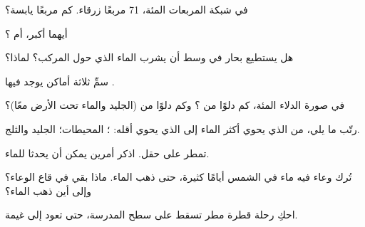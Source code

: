 \begin{exercise}[$\star$]\label{exo:g2:water-on-earth:3}
في شبكة المربعات المئة، 71 مربعًا زرقاء. كم مربعًا
يابسة؟
\end{exercise}

\begin{exercise}[$\star$]\label{exo:g2:water-on-earth:4}
أيهما أكبر،  أم ؟
\end{exercise}

\begin{exercise}[$\star$]\label{exo:g2:water-on-earth:5}
هل يستطيع بحار في وسط  أن يشرب الماء الذي حول المركب؟
لماذا؟
\end{exercise}

\begin{exercise}[$\star$]\label{exo:g2:water-on-earth:6}
سمِّ ثلاثة أماكن يوجد فيها .
\end{exercise}

\begin{exercise}[$\star\star$]\label{exo:g2:water-on-earth:7}
في صورة الدلاء المئة، كم دلوًا من ؟ وكم دلوًا من 
(الجليد والماء تحت الأرض معًا)؟
\end{exercise}

\begin{exercise}[$\star\star$]\label{exo:g2:water-on-earth:8}
رتّب ما يلي، من الذي يحوي أكثر الماء إلى الذي يحوي أقله: ؛
المحيطات؛ الجليد والثلج.
\end{exercise}

\begin{exercise}[$\star\star$]\label{exo:g2:water-on-earth:9}
تمطر على حقل. اذكر أمرين يمكن أن يحدثا للماء.
\end{exercise}

\begin{exercise}[$\star\star$]\label{exo:g2:water-on-earth:10}
تُرك وعاء فيه ماء  في الشمس أيامًا كثيرة، حتى ذهب الماء. ماذا بقي في
قاع الوعاء؟ وإلى أين ذهب الماء؟
\end{exercise}

\begin{exercise}[$\star\star$]\label{exo:g2:water-on-earth:11}
احكِ رحلة قطرة مطر تسقط على سطح المدرسة، حتى تعود إلى
غيمة.
\end{exercise}

